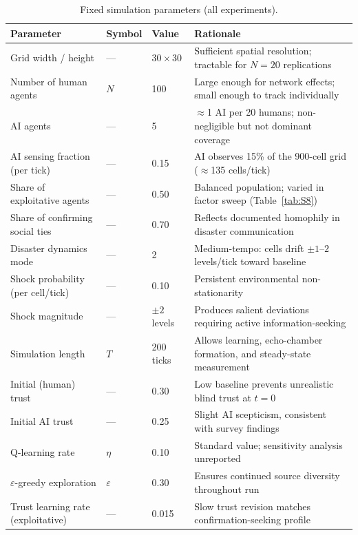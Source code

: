 \documentclass[pdflatex,sn-apa]{sn-jnl}%
\begin{document}
\begin{appendices}
\begin{table}[h]
\centering
\caption{Fixed simulation parameters (all experiments).}
\label{tab:S1}
\small
\begin{tabular}{llll}
\toprule
Parameter & Symbol & Value & Rationale \\
\midrule
Grid width / height         & ---  & $30\times30$   & Sufficient spatial resolution; tractable for $N=20$ replications \\
Number of human agents      & $N$  & 100            & Large enough for network effects; small enough to track individually \\
AI agents                   & ---  & 5              & $\approx$1 AI per 20 humans; non-negligible but not dominant coverage \\
AI sensing fraction (per tick) & ---& 0.15          & AI observes 15\% of the 900-cell grid ($\approx$135 cells/tick) \\
Share of exploitative agents & ---  & 0.50          & Balanced population; varied in factor sweep (Table~\ref{tab:S8}) \\
Share of confirming social ties & --- & 0.70        & Reflects documented homophily in disaster communication \\
Disaster dynamics mode      & ---  & 2              & Medium-tempo: cells drift $\pm1$--$2$ levels/tick toward baseline \\
Shock probability (per cell/tick) & --- & 0.10      & Persistent environmental non-stationarity \\
Shock magnitude             & ---  & $\pm2$ levels  & Produces salient deviations requiring active information-seeking \\
Simulation length           & $T$  & 200 ticks      & Allows learning, echo-chamber formation, and steady-state measurement \\
Initial (human) trust       & ---  & 0.30           & Low baseline prevents unrealistic blind trust at $t=0$ \\
Initial AI trust            & ---  & 0.25           & Slight AI scepticism, consistent with survey findings \\
Q-learning rate             & $\eta$ & 0.10         & Standard value; sensitivity analysis unreported \\
$\varepsilon$-greedy exploration & $\varepsilon$ & 0.30 & Ensures continued source diversity throughout run \\
Trust learning rate (exploitative) & --- & 0.015   & Slow trust revision matches confirmation-seeking profile \\

\end{tabular}
\end{table}
\end{appendices}
\end{document}
